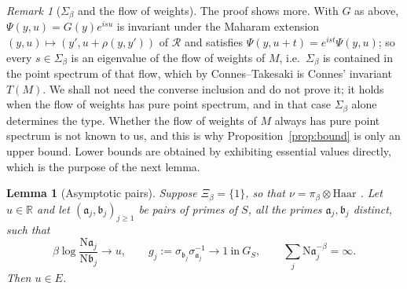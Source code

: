 \documentclass[11pt]{amsart}
\numberwithin{equation}{section}
\newtheorem{lemma}[theorem]{Lemma}
\theoremstyle{definition}
\theoremstyle{remark}
\newtheorem{remark}[theorem]{Remark}
\newcommand{\R}{\mathbb{R}}
\newcommand{\cR}{\mathcal{R}}
\newcommand{\aaa}{\mathfrak{a}}
\newcommand{\bb}{\mathfrak{b}}
\newcommand{\Ns}{\mathrm{N}}
\begin{document}
\begin{remark}[$\Sigma_\beta$ and the flow of weights]\label{rem:flow}
The proof shows more. With $G$ as above, $\Psi(y,u)=G(y)e^{isu}$ is invariant under the
Maharam extension $(y,u)\mapsto(y',u+\rho(y,y'))$ of $\cR$ \cite{Maharam} and satisfies
$\Psi(y,u+t)=e^{ist}\Psi(y,u)$; so every $s\in\Sigma_\beta$ is an eigenvalue of the flow of
weights of $M$, i.e.\ $\Sigma_\beta$ is contained in the point spectrum of that flow, which by
Connes--Takesaki \cite{CT} is Connes' invariant $T(M)$. We shall not need the converse
inclusion and do not prove it; it holds when the flow of weights has pure point spectrum,
and in that case $\Sigma_\beta$ alone determines the type. Whether the flow of weights of
$M$ always has pure point spectrum is not known to us, and this is why
Proposition~\ref{prop:bound} is only an upper bound. Lower bounds are obtained by exhibiting
essential values directly, which is the purpose of the next lemma.
\end{remark}

\begin{lemma}[Asymptotic pairs]\label{lem:pairs}
Suppose $\Xi_\beta=\{1\}$, so that $\nu=\pi_\beta\otimes\mathrm{Haar}$ \cite[Thm.~3.6]{Main}.
Let $u\in\R$ and let $(\aaa_j,\bb_j)_{j\ge1}$ be pairs of primes of $S$, all the primes
$\aaa_j,\bb_j$ distinct, such that
\[
\beta\log\frac{\Ns\aaa_j}{\Ns\bb_j}\to u,\qquad
g_j:=\sigma_{\bb_j}\sigma_{\aaa_j}^{-1}\to1\ \text{in}\ G_S,\qquad
\sum_j\Ns\aaa_j^{-\beta}=\infty .
\]
Then $u\in E$.
\end{lemma}
\end{document}
